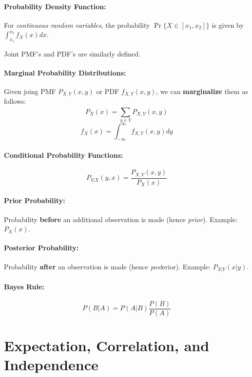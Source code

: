 \documentclass[a4paper,12pt]{report}
\begin{document}
\paragraph{Probability Density Function: } For \textit{continuous random variables}, the probability $\Pr\{X\in [x_1, x_2]\}$ is given by $\int_{x_1}^{x_2} f_X(x) dx$.

Joint PMF's and PDF's are similarly defined. 

\paragraph{Marginal Probability Distributions: } Given joing PMF $P_{X, Y}(x, y)$ or PDF $f_{X,Y}(x, y)$, we can \textbf{marginalize} them as follows:
\begin{equation}
P_X(x) = \sum_{y\in Y}^{} P_{X,Y}(x, y)
\end{equation}
\begin{equation}
f_X(x) = \int_{-\infty}^{\infty} f_{X,Y}(x,y)dy
\end{equation}

\paragraph{Conditional Probability Functions: } 
\begin{equation}
P_{Y|X}(y, x) = \frac{P_{X,Y}(x,y)}{P_X(x)} 
\end{equation}


\paragraph{Prior Probability: } Probability \textbf{before} an additional observation is made (hence \textit{prior}). Example: $P_X(x)$.

\paragraph{Posterior Probability: } Probability \textbf{after} an observation is made (hence \textit{post}erior). Example: $P_{X|Y}(x | y)$.

\paragraph{Bayes Rule: }
\begin{equation}
P(B|A) = P(A|B)\frac{P(B)}{P(A)}
\end{equation}

\section{Expectation, Correlation, and Independence} 
\end{document}
